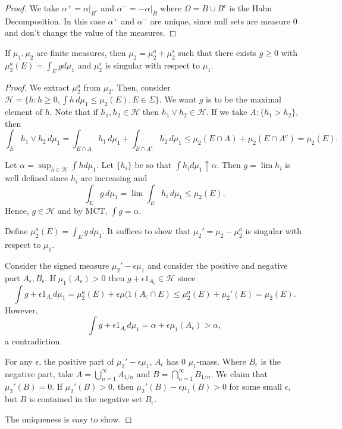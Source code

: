 \documentclass[11pt]{scrartcl}
\begin{document}
\begin{proof}
We take $\alpha^+ = \alpha \vert_{B^c}$ and $\alpha^- = -\alpha \vert_B$ where $\Omega = B \cup B^c$ is the Hahn Decomposition.  In this case $\alpha^+$ and $\alpha^-$ are unique, since null sets are measure $0$ and don't change the value of the measures.
\end{proof}
\begin{thm}
If $\mu_1, \mu_2$ are finite measures, then $\mu_2 = \mu_2^a + \mu_2^s$ such that there exists $g \ge 0$ with $\mu_2^a(E) = \int_E g d\mu_1$ and $\mu_2^s$ is singular with respect to $\mu_1$.
\end{thm}
\begin{proof}
We extract $\mu_2^a$ from $\mu_2$.  Then, consider $\mathcal H = \{h : h \ge 0, \int h\, d\mu_1 \le \mu_2(E), E \in \Sigma\}.$  We want $g$ is to be the maximal element of $h$.    Note that if $h_1, h_2 \in \mathcal H$ then $h_1 \vee h_2 \in \mathcal H$.  If we take $A : \{h_1 > h_2\}$, then 
$$\int_E h_1 \vee h_2 \, d\mu_1 = \int_{E \cap A} h_1 \, d\mu_1 + \int_{E \cap A^c} h_2\, d\mu_1 \le \mu_2(E \cap A) + \mu_2(E \cap A^c) = \mu_2(E).$$

Let $\alpha = \sup_{h \in \mathcal H} \int h d\mu_1$.  Let $\{h_i\}$ be so that $\int h_i d\mu_1 \uparrow \alpha$.  Then $g = \lim h_i$ is well defined since $h_i$ are increasing and 
$$\int_E g \, d\mu_1 = \lim \int_E h_i\, d\mu_1 \le \mu_2(E).$$
Hence, $g \in \mathcal H$ and by MCT, $\int g = \alpha$.  

Define $\mu_2^a(E) = \int_E g\,d\mu_1$.  It suffices to show that $\mu_2' = \mu_2 - \mu_2^a$ is singular with respect to $\mu_1$.

Consider the signed measure $\mu_2' - \epsilon \mu_1$ and consider the positive and negative part $A_\epsilon, B_\epsilon$.  If $\mu_1(A_\epsilon) > 0$ then $g + \epsilon 1_{A_\epsilon} \in \mathcal H$ since 
$$\int g + \epsilon 1_{A_\epsilon} d\mu_1 = \mu_2^a(E) + \epsilon \mu(1(A_\epsilon \cap E) \le \mu_2^a(E) + \mu_2'(E)= \mu_2(E).$$
However, $$\int g + \epsilon 1_{A_\epsilon}d\mu_1 = \alpha + \epsilon \mu_1(A_\epsilon) > \alpha,$$
a contradiction.  

For any $\epsilon$, the positive part of $\mu_2' - \epsilon \mu_1$, $A_\epsilon$ has $0$ $\mu_1$-mass.  Where $B_\epsilon$ is the negative part, take $A = \bigcup_{n=1}^{\infty} A_{1/n}$ and $B = \bigcap_{n=1}^{\infty} B_{1/n}$.  We claim that $\mu_2'(B) = 0$.  If $\mu_2'(B) > 0$, then $\mu_2'(B) - \epsilon \mu_1(B) > 0$ for some small $\epsilon$, but $B$ is contained in the negative set $B_\epsilon$.  

The uniqueness is easy to show.
 \end{proof}
 
\end{document}
